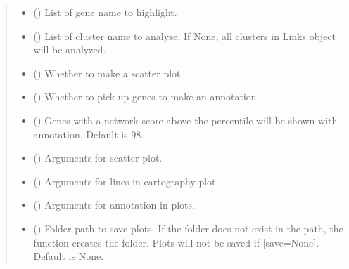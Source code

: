 \documentclass[letterpaper,10pt,english]{sphinxmanual}
\begin{document}
\begin{fulllineitems}
\begin{fulllineitems}
\begin{quote}
\begin{description}
\begin{itemize}
\item {} 
 () \textendash{} List of gene name to highlight.

\item {} 
 () \textendash{} List of cluster name to analyze. If None, all clusters in Links object will be analyzed.

\item {} 
 () \textendash{} Whether to make a scatter plot.

\item {} 
 () \textendash{} Whether to pick up genes to make an annotation.

\item {} 
 () \textendash{} Genes with a network score above the percentile will be shown with annotation. Default is 98.

\item {} 
 () \textendash{} Arguments for scatter plot.

\item {} 
 () \textendash{} Arguments for lines in cartography plot.

\item {} 
 () \textendash{} Arguments for annotation in plots.

\item {} 
 () \textendash{} Folder path to save plots. If the folder does not exist in the path, the function creates the folder.
Plots will not be saved if {[}save=None{]}. Default is None.

\end{itemize}

\end{description}\end{quote}


\end{fulllineitems}
\end{fulllineitems}
\end{document}
